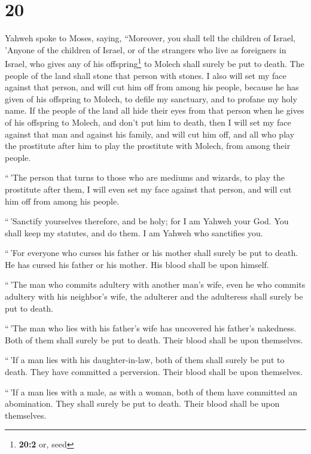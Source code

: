 \hypertarget{section-19}{%
\section{20}\label{section-19}}

 Yahweh spoke to Moses, saying,  ``Moreover,
you shall tell the children of Israel, 'Anyone of the children of
Israel, or of the strangers who live as foreigners in Israel, who gives
any of his offspring\footnote{\textbf{20:2} or, seed} to Molech shall
surely be put to death. The people of the land shall stone that person
with stones.  I also will set my face against that person,
and will cut him off from among his people, because he has given of his
offspring to Molech, to defile my sanctuary, and to profane my holy
name.  If the people of the land all hide their eyes from
that person when he gives of his offspring to Molech, and don't put him
to death,  then I will set my face against that man and
against his family, and will cut him off, and all who play the
prostitute after him to play the prostitute with Molech, from among
their people.

 ``\,'The person that turns to those who are mediums and
wizards, to play the prostitute after them, I will even set my face
against that person, and will cut him off from among his people.

 ``\,'Sanctify yourselves therefore, and be holy; for I am
Yahweh your God.  You shall keep my statutes, and do them.
I am Yahweh who sanctifies you.

 ``\,'For everyone who curses his father or his mother
shall surely be put to death. He has cursed his father or his mother.
His blood shall be upon himself.

 ``\,'The man who commits adultery with another man's
wife, even he who commits adultery with his neighbor's wife, the
adulterer and the adulteress shall surely be put to death.

 ``\,'The man who lies with his father's wife has
uncovered his father's nakedness. Both of them shall surely be put to
death. Their blood shall be upon themselves.

 ``\,'If a man lies with his daughter-in-law, both of
them shall surely be put to death. They have committed a perversion.
Their blood shall be upon themselves.

 ``\,'If a man lies with a male, as with a woman, both of
them have committed an abomination. They shall surely be put to death.
Their blood shall be upon themselves.

